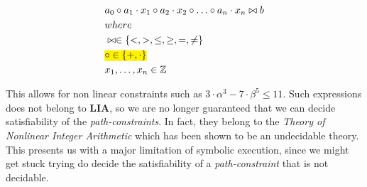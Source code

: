 	  
	 
	 \begin{align*}
	 	& a_0 \circ a_1 \cdot x_1 \circ a_2 \cdot x_2 \circ \ldots \circ a_n \cdot x_n \bowtie b \\
	 	& where \\
	 	& \bowtie \in  \{  <, >, \leq, \geq, =, \neq \}\\
	 	& \text{\hl{$\circ \in  \{ +, \cdot \}$}}\\
	 	& x_1, \ldots, x_n \in \mathbb{Z}
	 \end{align*}
	
	This allows for non linear constraints such as $3 \cdot \alpha ^3 - 7\cdot \beta ^ 5 \leq 11$. Such expressions does not belong to \textbf{LIA}, so we are no longer guaranteed that we can decide satisfiability of the \emph{path-constraints}. In fact, they belong to the \emph{Theory of Nonlinear Integer Arithmetic} which has been shown to be an undecidable theory. %
	This presents us with a major limitation of symbolic execution, since we might get stuck trying do decide the satisfiability of a \emph{path-constraint} that is not decidable. 
	
	
	
	
	
	